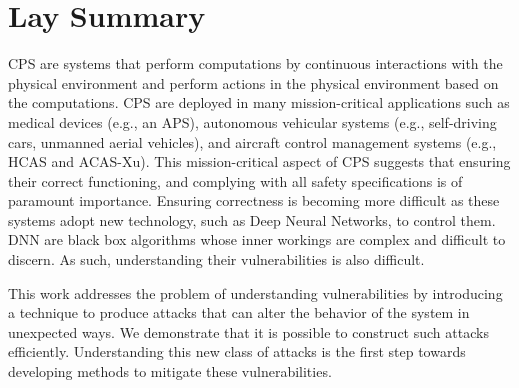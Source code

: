 

\chapter{Lay Summary}

\ac{CPS} are systems that perform computations by continuous interactions with the physical environment and perform actions in the physical environment based on the computations. 
\ac{CPS} are deployed in many mission-critical applications such as medical devices (e.g., an \ac{APS}), autonomous vehicular systems (e.g., self-driving cars, unmanned aerial vehicles), and aircraft control management systems (e.g.,  \ac{HCAS} and \ac{ACAS-Xu}). 
This mission-critical aspect of CPS suggests that ensuring their correct functioning, and complying with all safety specifications is of paramount importance. 
Ensuring correctness is becoming more difficult as these systems adopt new technology, such as Deep Neural Networks, to control them. 
\ac{DNN} are black box algorithms whose inner workings are complex and difficult to discern.
As such, understanding their vulnerabilities is also difficult. 

This work addresses the problem of understanding vulnerabilities by introducing a  technique to produce attacks that can alter the behavior of the system in unexpected ways. 
We demonstrate that it is possible  to construct such attacks efficiently. 
Understanding this new class of attacks is the first step towards developing methods to mitigate these vulnerabilities. 



 



